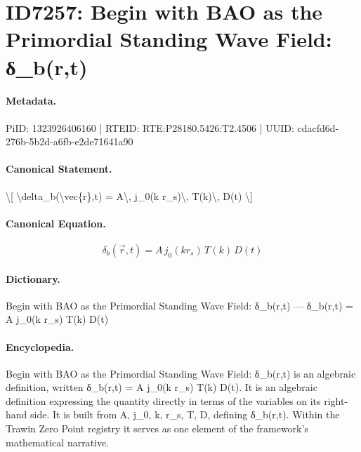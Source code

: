 \section*{ID7257: Begin with BAO as the Primordial Standing Wave Field: δ\_b(r,t)}
\paragraph{Metadata.}
PiID: 1323926406160 | RTEID: RTE:P28180.5426:T2.4506 | UUID: cdacfd6d-276b-5b2d-a6fb-e2de71641a90

\paragraph{Canonical Statement.}
\textbackslash{}[ \textbackslash{}delta\_b(\textbackslash{}vec\{r\},t) = A\textbackslash{}, j\_0(k r\_s)\textbackslash{}, T(k)\textbackslash{}, D(t) \textbackslash{}]

\paragraph{Canonical Equation.}
\[
\delta_b(\vec{r},t) = A\, j_0(k r_s)\, T(k)\, D(t)
\]

\paragraph{Dictionary.}
Begin with BAO as the Primordial Standing Wave Field: δ\_b(r,t) — δ\_b(r,t) = A j\_0(k r\_s) T(k) D(t)

\paragraph{Encyclopedia.}
Begin with BAO as the Primordial Standing Wave Field: δ\_b(r,t) is an algebraic definition, written δ\_b(r,t) = A j\_0(k r\_s) T(k) D(t). It is an algebraic definition expressing the quantity directly in terms of the variables on its right-hand side. It is built from A, j\_0, k, r\_s, T, D, defining δ\_b(r,t). Within the Trawin Zero Point registry it serves as one element of the framework's mathematical narrative.
